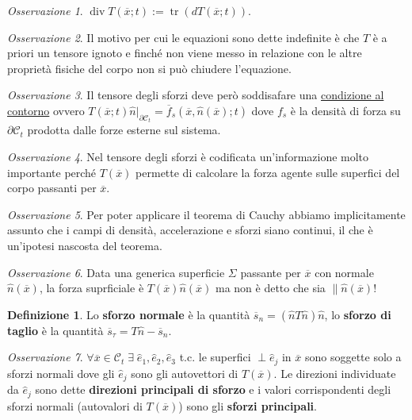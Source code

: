 \documentclass{book}
\theoremstyle{plain}
\theoremstyle{plain}
\theoremstyle{plain}
\theoremstyle{plain}
\theoremstyle{plain}
\theoremstyle{definition}
\newtheorem{defi}{Definizione}[chapter]
\theoremstyle{remark}
\newtheorem*{oss}{Osservazione}
\theoremstyle{definition}
\begin{document}
\begin{oss}
    $\operatorname{div}T(\overline{x};t):=\operatorname{tr}(dT(\overline{x};t))$.
\end{oss}

\begin{oss}
    Il motivo per cui le equazioni sono dette indefinite è che $T$ è a priori un tensore ignoto e finché non viene messo in relazione con le altre proprietà fisiche del corpo non si può chiudere l'equazione.
\end{oss}

\begin{oss}
    Il tensore degli sforzi deve però soddisafare una \underline{condizione al contorno} ovvero $T(\overline{x};t)\hat{n}\big|_{\partial\mathcal{C}_t}=\overline{f}_s(\overline{x},\hat{n}(\overline{x});t)$ dove  $f_s$ è la densità di forza su $\partial\mathcal{C}_t$ prodotta dalle forze esterne sul sistema.
\end{oss}

\begin{oss}
    Nel tensore degli sforzi è codificata un'informazione molto importante perché $T(\overline{x})$ permette di calcolare la forza agente sulle superfici del corpo passanti per $\overline{x}$.
\end{oss}

\begin{oss}
    Per poter applicare il teorema di Cauchy abbiamo implicitamente assunto che i campi di densità, accelerazione e sforzi siano continui, il che è un'ipotesi nascosta del teorema.
\end{oss}

\begin{oss}
    Data una generica superficie $\Sigma$ passante per $\overline{x}$ con normale $\hat{n}(\overline{x})$, la forza suprficiale è $T(\overline{x})\hat{n}(\overline{x})$  ma non è detto che sia $\parallel \hat{n}(\overline{x})$!
\end{oss}

\begin{defi}
   Lo \textbf{sforzo normale} è la quantità $\overline{s}_n=(\hat{n}T\hat{n})\hat{n}$, lo \textbf{sforzo di taglio} è la quantità $\overline{s}_{\tau}=T\hat{n}-\overline{s}_n$.
\end{defi}

\begin{oss}
    $\forall \overline{x}\in\mathcal{C}_t \; \exists \; \hat{e}_1,\hat{e}_2,\hat{e}_3$ t.c. le superfici $\perp \hat{e}_j$ in $\overline{x}$ sono soggette solo a sforzi normali dove gli $\hat{e}_j$ sono gli autovettori di $T(\overline{x})$. Le direzioni individuate da $\hat{e}_j$ sono dette \textbf{direzioni principali di sforzo} e i valori corrispondenti degli sforzi normali (autovalori di $T(\overline{x})$) sono gli \textbf{sforzi principali}.
\end{oss}
\end{document}

